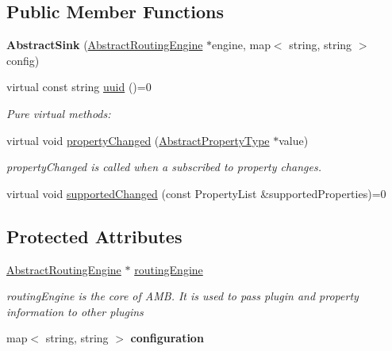\subsection*{Public Member Functions}
\begin{DoxyCompactItemize}
\item 
\hypertarget{classAbstractSink_a63f03d63fd091cd6f39a9888dd08ea6a}{{\bfseries Abstract\+Sink} (\hyperlink{classAbstractRoutingEngine}{Abstract\+Routing\+Engine} $\ast$engine, map$<$ string, string $>$ config)}\label{classAbstractSink_a63f03d63fd091cd6f39a9888dd08ea6a}

\item 
virtual const string \hyperlink{classAbstractSink_a965ae1d5218713c7823fbd95fa51b053}{uuid} ()=0
\begin{DoxyCompactList}\small\item\em Pure virtual methods\+: \end{DoxyCompactList}\item 
virtual void \hyperlink{classAbstractSink_afeb683c566a5a71303d05d2e12da2b28}{property\+Changed} (\hyperlink{classAbstractPropertyType}{Abstract\+Property\+Type} $\ast$value)
\begin{DoxyCompactList}\small\item\em property\+Changed is called when a subscribed to property changes. \end{DoxyCompactList}\item 
virtual void \hyperlink{classAbstractSink_aa9538a89536e8b6495551283116a588b}{supported\+Changed} (const Property\+List \&supported\+Properties)=0
\end{DoxyCompactItemize}
\subsection*{Protected Attributes}
\begin{DoxyCompactItemize}
\item 
\hypertarget{classAbstractSink_a4d49a722e60cd9993c182a29fbf74591}{\hyperlink{classAbstractRoutingEngine}{Abstract\+Routing\+Engine} $\ast$ \hyperlink{classAbstractSink_a4d49a722e60cd9993c182a29fbf74591}{routing\+Engine}}\label{classAbstractSink_a4d49a722e60cd9993c182a29fbf74591}

\begin{DoxyCompactList}\small\item\em routing\+Engine is the core of A\+M\+B. It is used to pass plugin and property information to other plugins \end{DoxyCompactList}\item 
\hypertarget{classAbstractSink_a52581d514cad8b74a9fb42a026522f76}{map$<$ string, string $>$ {\bfseries configuration}}\label{classAbstractSink_a52581d514cad8b74a9fb42a026522f76}

\end{DoxyCompactItemize}


